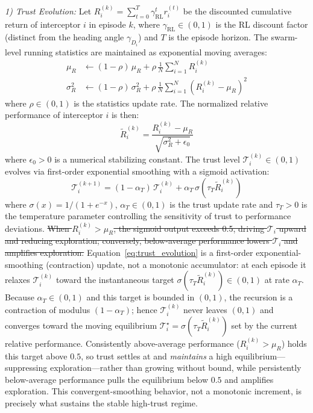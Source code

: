 \documentclass[lettersize,journal]{IEEEtran}
\newcommand{\hladd}[1]{{\color{blue}#1}}
\newcommand{\hldel}[1]{{\color{red}\sout{#1}}}
\begin{document}
\emph{1) Trust Evolution:} Let $R_i^{(k)} = \sum_{t=0}^{T} \gamma_{\mathrm{RL}}^t r_i^{(t)}$ be the discounted cumulative return of interceptor $i$ in episode $k$, where $\gamma_{\mathrm{RL}} \in (0,1)$ is the RL discount factor (distinct from the heading angle $\gamma_{D_i}$) and $T$ is the episode horizon. The swarm-level running statistics are maintained as exponential moving averages:
\begin{align}
\mu_R &\leftarrow (1-\rho)\,\mu_R + \rho\,\frac{1}{N}\sum_{i=1}^{N} R_i^{(k)} \label{eq:running_stats_mu} \\
\sigma_R^2 &\leftarrow (1-\rho)\,\sigma_R^2 + \rho\,\frac{1}{N}\sum_{i=1}^{N}\!\left(R_i^{(k)} - \mu_R\right)^2 \label{eq:running_stats_sigma}
\end{align}
where $\rho \in (0,1)$ is the statistics update rate. The normalized relative performance of interceptor $i$ is then:
\begin{equation}
\label{eq:trust_normalized}
\tilde{R}_i^{(k)} = \frac{R_i^{(k)} - \mu_R}{\sqrt{\sigma_R^2 + \epsilon_0}}
\end{equation}
where $\epsilon_0 > 0$ is a numerical stabilizing constant. The trust level $\mathcal{T}_i^{(k)} \in (0,1)$ evolves via first-order exponential smoothing with a sigmoid activation:
\begin{equation}
\label{eq:trust_evolution}
\mathcal{T}_i^{(k+1)} = (1-\alpha_T)\,\mathcal{T}_i^{(k)} + \alpha_T\,\sigma\!\left(\tau_T \tilde{R}_i^{(k)}\right)
\end{equation}
where $\sigma(x) = 1/(1+e^{-x})$, $\alpha_T \in (0,1)$ is the trust update rate and $\tau_T > 0$ is the temperature parameter controlling the sensitivity of trust to performance deviations. \hldel{When $R_i^{(k)} > \mu_R$, the sigmoid output exceeds 0.5, driving $\mathcal{T}_i$ upward and reducing exploration; conversely, below-average performance lowers $\mathcal{T}_i$ and amplifies exploration.} \hladd{Equation~\eqref{eq:trust_evolution} is a first-order exponential-smoothing (contraction) update, not a monotonic accumulator: at each episode it relaxes $\mathcal{T}_i^{(k)}$ toward the instantaneous target $\sigma(\tau_T\tilde{R}_i^{(k)})\in(0,1)$ at rate $\alpha_T$. Because $\alpha_T\in(0,1)$ and this target is bounded in $(0,1)$, the recursion is a contraction of modulus $(1-\alpha_T)$; hence $\mathcal{T}_i^{(k)}$ never leaves $(0,1)$ and converges toward the moving equilibrium $\mathcal{T}_i^{\star}=\sigma(\tau_T\tilde{R}_i^{(k)})$ set by the current relative performance. Consistently above-average performance ($R_i^{(k)}>\mu_R$) holds this target above $0.5$, so trust settles at and \emph{maintains} a high equilibrium---suppressing exploration---rather than growing without bound, while persistently below-average performance pulls the equilibrium below $0.5$ and amplifies exploration. This convergent-smoothing behavior, not a monotonic increment, is precisely what sustains the stable high-trust regime.}
\end{document}
